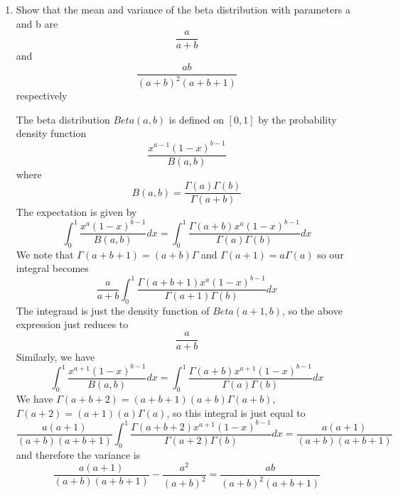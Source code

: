 \documentclass{article}
\newcommand{\chapternumber}{2}
\newenvironment{QandA}{\begin{enumerate}[label=\chapternumber.\arabic*]\bfseries\boldmath}
	{\end{enumerate}}
\newenvironment{answered}{\par\bigskip\normalfont\unboldmath}{}
\begin{document}
\begin{QandA}
		\item Show that the mean and variance of the beta distribution with parameters a and b are \[\frac{a}{a+b}\] and \[\frac{ab}{(a+b)^2(a+b+1)}\]
		respectively
		\begin{answered}
			The beta distribution $Beta(a,b)$ is defined on $[0,1]$ by the probability density function
			\[\frac{x^{a-1}(1-x)^{b-1}}{B(a,b)}\]
			where
			\[B(a,b)=\frac{\Gamma(a)\Gamma(b)}{\Gamma(a+b)}\]
			The expectation is given by 
			\[\int_0^1 \frac{x^a(1-x)^{b-1}}{B(a,b)} dx = \int_0^1 \frac{\Gamma(a+b)x^a(1-x)^{b-1}}{\Gamma(a)\Gamma(b)} dx\]
			We note that $\Gamma(a+b+1)=(a+b)\Gamma$ and $\Gamma(a+1)=a\Gamma(a)$ so our integral becomes
			\[\frac{a}{a+b}\int_0^1 \frac{\Gamma(a+b+1)x^a(1-x)^{b-1}}{\Gamma(a+1)\Gamma(b)} dx\]
			The integrand is just the density function of $Beta(a+1,b)$, so the above expression just reduces to 
			\[\frac{a}{a+b}\]
			Similarly, we have
			\[\int_0^1 \frac{x^{a+1}(1-x)^{b-1}}{B(a,b)} dx = \int_0^1 \frac{\Gamma(a+b)x^{a+1}(1-x)^{b-1}}{\Gamma(a)\Gamma(b)} dx\]
			We have $\Gamma(a+b+2)=(a+b+1)(a+b)\Gamma(a+b)$, $\Gamma(a+2)=(a+1)(a)\Gamma(a)$, so this integral is just equal to
			\[\frac{a(a+1)}{(a+b)(a+b+1)}\int_0^1 \frac{\Gamma(a+b+2)x^{a+1}(1-x)^{b-1}}{\Gamma(a+2)\Gamma(b)} dx = \frac{a(a+1)}{(a+b)(a+b+1)}\]
			and therefore the variance is
			\[\frac{a(a+1)}{(a+b)(a+b+1)}-\frac{a^2}{(a+b)^2} = \frac{ab}{(a+b)^2(a+b+1)}\]
		\end{answered}

	\end{QandA}
\end{document}
